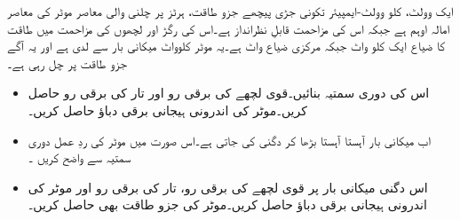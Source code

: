 %
ایک  وولٹ،  کلو وولٹ-ایمپیئر تکونی جڑی  پیچھے جزو طاقت،  ہرٹز پر چلنی والی معاصر موٹر کی معاصر امالہ  اوہم ہے جبکہ اس کی مزاحمت قابلِ نظرانداز ہے۔اس کی رگڑ اور لچھوں کی مزاحمت میں طاقت کا ضیاع ایک کلو واٹ جبکہ مرکزی ضیاع  واٹ ہے۔یہ موٹر   کلوواٹ میکانی بار سے لدی ہے اور یہ   آگے جزو طاقت   پر چل رہی ہے۔
\begin{itemize}
\item
اس کی دوری سمتیہ بنائیں۔قوی لچھے کی برقی رو  اور تار کی برقی رو  حاصل کریں۔موٹر کی اندرونی ہیجانی برقی دباؤ  حاصل کریں۔
\item
اب میکانی بار آہستا آہستا بڑھا کر دگنی کی جاتی ہے۔اس صورت میں موٹر کی ردِ عمل دوری سمتیہ سے واضح کریں ۔
\item
اس دگنی میکانی بار پر قوی لچھے  کی برقی رو،  تار کی برقی رو  اور موٹر کی اندرونی ہیجانی برقی دباؤ حاصل کریں۔موٹر کی جزو طاقت بھی حاصل کریں۔
\end{itemize}

